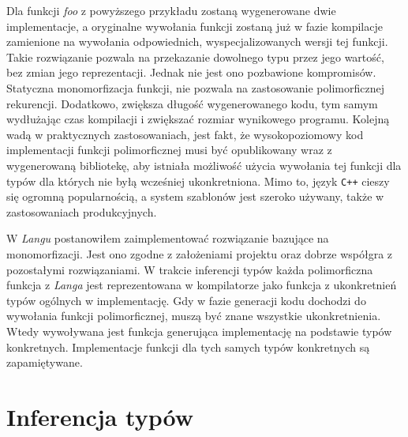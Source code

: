 \documentclass[declaration,shortabstract]{iithesis}
\begin{document}
Dla funkcji \textit{foo} z powyższego przykładu zostaną wygenerowane dwie 
implementacje, a oryginalne wywołania funkcji zostaną już w fazie kompilacje
zamienione na wywołania odpowiednich, wyspecjalizowanych wersji tej funkcji.
Takie rozwiązanie pozwala na przekazanie dowolnego typu przez jego wartość, 
bez zmian jego reprezentacji. Jednak nie jest ono pozbawione kompromisów. 
Statyczna monomorfizacja funkcji, nie pozwala na zastosowanie polimorficznej
rekurencji. Dodatkowo, zwiększa długość wygenerowanego kodu, tym samym 
wydłużając czas kompilacji i zwiększać rozmiar wynikowego programu. Kolejną 
wadą w praktycznych zastosowaniach, jest fakt, że wysokopoziomowy kod 
implementacji funkcji polimorficznej musi być opublikowany wraz z wygenerowaną 
bibliotekę, aby istniała możliwość użycia wywołania tej funkcji dla typów dla 
których nie byłą wcześniej ukonkretniona. Mimo to, język \texttt{C++} cieszy 
się ogromną popularnością, a system szablonów jest szeroko używany, także w 
zastosowaniach produkcyjnych. 

W \textit{Langu} postanowiłem zaimplementować rozwiązanie bazujące na 
monomorfizacji. Jest ono zgodne z założeniami projektu oraz dobrze współgra z 
pozostałymi rozwiązaniami. W trakcie inferencji typów każda polimorficzna 
funkcja z \textit{Langa} jest reprezentowana w kompilatorze jako funkcja z 
ukonkretnień typów ogólnych w implementację. Gdy w fazie generacji kodu 
dochodzi do wywołania funkcji polimorficznej, muszą być znane wszystkie 
ukonkretnienia. Wtedy wywoływana jest funkcja generująca implementację na 
podstawie typów konkretnych. Implementacje funkcji dla tych samych typów 
konkretnych są zapamiętywane.



\section{Inferencja typów}
\end{document}
